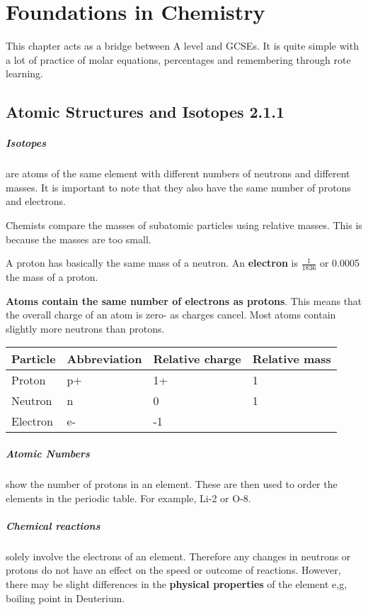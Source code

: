 \chapter{Foundations in Chemistry}
    This chapter acts as a bridge between A level and GCSEs. It is quite       simple with a lot of practice of molar equations, percentages and           remembering through rote learning.
    
\section{Atomic Structures and Isotopes 2.1.1}
      \paragraph{Isotopes}are atoms of the same element with different numbers of neutrons and different masses. It is important to note that they also have the same number of protons and electrons.
      
Chemists compare the masses of subatomic particles using relative masses. This is because the masses are too small.

A proton has basically the same mass of a neutron. An \textbf{electron} is \textbf{\( \frac{1}{1836} \)} or 0.0005 the mass of a proton.

\textbf{Atoms contain the same number of electrons as protons}. This means that the overall charge of an atom is zero- as charges cancel. Most atoms contain slightly more neutrons than protons.



\begin{tabular}{ |p{3cm}||p{3cm}|p{3cm}|p{3cm}|  }
 \hline
 Particle    & Abbreviation &Relative charge&Relative mass\\
 \hline
 Proton   & p+    &1+&   1\\
 Neutron& n  & 0   &1\\
 Electron& e-  & -1&\(\frac{1}{1836} \/0.0005)\\
 \hline
\end{tabular}

\paragraph{Atomic Numbers}show the number of protons in an element. These are then used to order the elements in the periodic table. For example, Li-2 or O-8.

\paragraph{Chemical reactions} solely involve the electrons of an element. Therefore any changes in neutrons or protons do not have an effect on the speed or outcome of reactions. However, there may be slight differences in the \textbf{physical properties} of the element e,g, boiling point in Deuterium.
